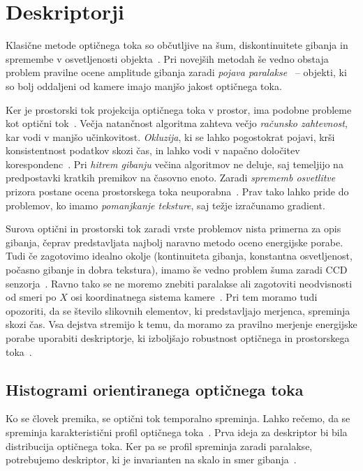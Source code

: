 \section{Deskriptorji}
Klasične metode optičnega toka so občutljive na šum, diskontinuitete gibanja in spremembe v osvetljenosti objekta~\cite{brox2011large}. Pri novejših metodah še vedno obstaja problem pravilne ocene amplitude gibanja zaradi \emph{pojava paralakse}~\cite{xu2012scale} -- objekti, ki so bolj oddaljeni od kamere imajo manjšo jakost optičnega toka. 


Ker je prostorski tok projekcija optičnega toka v prostor, ima podobne probleme kot optični tok~\cite{yan2016scene}. Večja natančnost algoritma zahteva večjo \emph{računsko zahtevnost}, kar vodi v manjšo učinkovitost. \emph{Okluzija}, ki se lahko pogostokrat pojavi, krši konsistentnost podatkov skozi čas, in lahko vodi v napačno določitev korespondenc~\cite{yan2016scene}. Pri \emph{hitrem gibanju} večina algoritmov ne deluje, saj temeljijo na predpostavki kratkih premikov na časovno enoto. Zaradi \emph{sprememb osvetlitve} prizora postane ocena prostorskega toka neuporabna~\cite{yan2016scene}. Prav tako lahko pride do problemov, ko imamo \emph{pomanjkanje teksture}, saj težje izračunamo gradient.

Surova optični in prostorski tok zaradi vrste problemov nista primerna za opis gibanja, čeprav predstavljata najbolj naravno metodo oceno energijske porabe. Tudi če zagotovimo idealno okolje (kontinuiteta gibanja, konstantna osvetljenost, počasno gibanje in dobra tekstura), imamo še vedno problem šuma zaradi CCD senzorja~\cite{wedel2011stereo}. Ravno tako se ne moremo znebiti paralakse ali zagotoviti neodvisnosti od smeri po $X$ osi koordinatnega sistema kamere~\cite{chaudhry2009histograms}. Pri tem moramo tudi opozoriti, da se število slikovnih elementov, ki predstavljajo merjenca, spreminja skozi čas. Vsa dejstva stremijo k temu, da moramo za pravilno merjenje energijske porabe uporabiti deskriptorje, ki izboljšajo robustnost optičnega in prostorskega toka~\cite{chaudhry2009histograms}. 







\subsection{Histogrami orientiranega optičnega toka}\label{sec:hoof}
Ko se človek premika, se optični tok temporalno spreminja. Lahko rečemo, da se spreminja karakteristični profil optičnega toka~\cite{chaudhry2009histograms}. Prva ideja za deskriptor bi bila distribucija optičnega toka. Ker pa se profil spreminja zaradi paralakse, potrebujemo deskriptor, ki je invarianten na skalo in smer gibanja~\cite{chaudhry2009histograms}.

